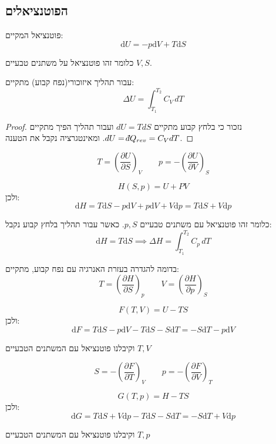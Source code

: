 \documentclass{tstextbook}
\begin{document}
\subsection{הפוטנציאלים}

\begin{definition}
פוטנציאל  המקיים:
$$\mathrm{d}U=-p\mathrm{d}V+T\mathrm{d}S$$

\end{definition}
כלומר זהו פוטנציאל על משתנים טבעיים \(V,S\).

\begin{proposition}
עבור תהליך איזוכורי(נפח קבוע) מתקיים:
$$\Delta U = \int_{T_{1}}^{T_{2}} C_{V} \, dT $$

\end{proposition}
\begin{proof}
נזכור כי בלחץ קבוע מתקיים \(dU=TdS\) ועבור תהליך הפיך מתקיים \(dU=\;\bar{}\mkern-7.5mu dQ_{rev}=C_{V}dT\). ומאינטגרציה נקבל את הטענה.

\end{proof}
\begin{proposition}
$$T=\left(\frac{\partial U}{\partial S}\right)_{V}\qquad p=-\left(\frac{\partial U}{\partial V}\right)_{S}$$

\end{proposition}
\begin{definition}[אנטלפיה]
$$H(S,p)=U+PV$$
ולכן:
$$\mathrm{d}H=T\mathrm{d}S-p\mathrm{d}V+p\mathrm{d}V+V\mathrm{d}p=T\mathrm{d}S+V\mathrm{d}p$$

\end{definition}
כלומר זהו פוטנציאל עם משתנים טבעיים \(p,S\).
כאשר עבור תהליך בלחץ קבוע נקבל: 
$$\mathrm{d}H=T\mathrm{d}S\implies \Delta H = \int_{T_{1}}^{T_{2}} C_{p} \, dT$$

\begin{corollary}
בדומה להגדרה בעזרת האנרגיה עם נפח קבוע, מתקיים:
$$T=\left(\frac{\partial H}{\partial S}\right)_{p}\qquad V=\left(\frac{\partial H}{\partial p}\right)_{S}$$

\end{corollary}
\begin{definition}
$$F(T,V)=U-TS$$
ולכן:
$$\mathrm{d}F=T\mathrm{d}S-p\mathrm{d}V-T\mathrm{d}S-S\mathrm{d}T=-S\mathrm{d}T-p\mathrm{d}V$$

\end{definition}
וקיבלנו פוטנציאל עם המשתנים הטבעיים \(T,V\)

\begin{corollary}
$$S=-\left(\frac{\partial F}{\partial T}\right)_{V}\qquad p=-\left({\frac{\partial F}{\partial V}}\right)_{T}$$

\end{corollary}
\begin{definition}
$$G(T,p)=H-TS$$
ולכן:
$$\mathrm{d}G=T\mathrm{d}S+V\mathrm{d}p-T\mathrm{d}S-S\mathrm{d}T=-S\mathrm{d}T+V\mathrm{d}p$$

\end{definition}
וקיבלנו פוטנציאל עם המשתנים הטבעיים \(T,p\)
\end{document}
